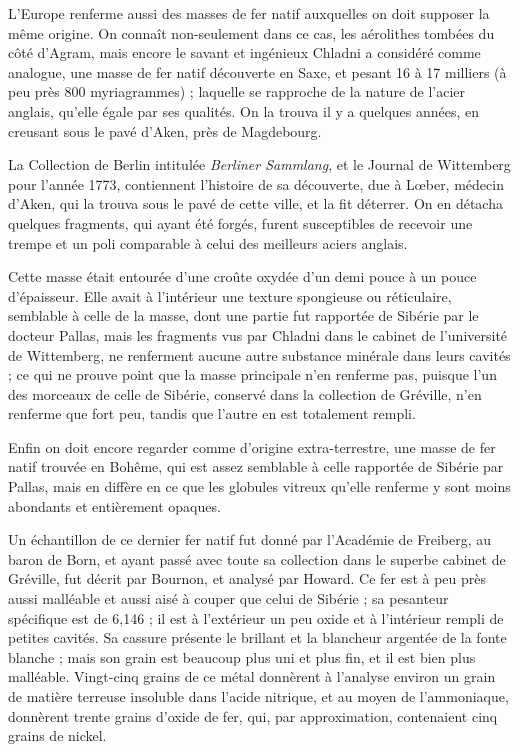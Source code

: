 \documentclass[a4paper, 12pt, oneside, french]{article}
\begin{document}
L'Europe renferme aussi des masses de fer natif auxquelles on doit supposer la même origine. On connaît non-seulement dans ce cas, les aérolithes tombées du côté d'Agram, mais encore le savant et ingénieux Chladni a considéré comme analogue, une masse de fer natif découverte en Saxe, et pesant 16 à 17 milliers (à peu près 800 myriagrammes) ; laquelle se rapproche de la nature de l'acier anglais, qu'elle égale par ses qualités. On la trouva il y a quelques années, en creusant sous le pavé d'Aken, près de Magdebourg.

La Collection de Berlin intitulée \emph{Berliner Sammlang}, et le Journal de Wittemberg pour l'année 1773, contiennent l'histoire de sa découverte, due à Lœber, médecin d'Aken, qui la trouva sous le pavé de cette ville, et la fit déterrer. On en détacha quelques fragments, qui ayant été forgés, furent susceptibles de recevoir une trempe et un poli comparable à celui des meilleurs aciers anglais.

Cette masse était entourée d'une croûte oxydée d'un demi pouce à un pouce d'épaisseur. Elle avait à l'intérieur une texture spongieuse ou réticulaire, semblable à celle de la masse, dont une partie fut rapportée de Sibérie par le docteur Pallas, mais les fragments vus par Chladni dans le cabinet de l'université de Wittemberg, ne renferment aucune autre substance minérale dans leurs cavités ; ce qui ne prouve point que la masse principale n'en renferme pas, puisque l'un des morceaux de celle de Sibérie, conservé dans la collection de Gréville, n'en renferme que fort peu, tandis que l'autre en est totalement rempli.

Enfin on doit encore regarder comme d'origine extra-terrestre, une masse de fer natif trouvée en Bohême, qui est assez semblable à celle rapportée de Sibérie par Pallas, mais en diffère en ce que les globules vitreux qu'elle renferme y sont moins abondants et entièrement opaques.

Un échantillon de ce dernier fer natif fut donné par l'Académie de Freiberg, au baron de Born, et ayant passé avec toute sa collection dans le superbe cabinet de Gréville, fut décrit par Bournon, et analysé par Howard. Ce fer est à peu près aussi malléable et aussi aisé à couper que celui de Sibérie ; sa pesanteur spécifique est de 6,146 ; il est à l'extérieur un peu oxide et à l'intérieur rempli de petites cavités. Sa cassure présente le brillant et la blancheur argentée de la fonte blanche ; mais son grain est beaucoup plus uni et plus fin, et il est bien plus malléable. Vingt-cinq grains de ce métal donnèrent à l'analyse environ un grain de matière terreuse insoluble dans l'acide nitrique, et au moyen de l'ammoniaque, donnèrent trente grains d'oxide de fer, qui, par approximation, contenaient cinq grains de nickel.
\end{document}
